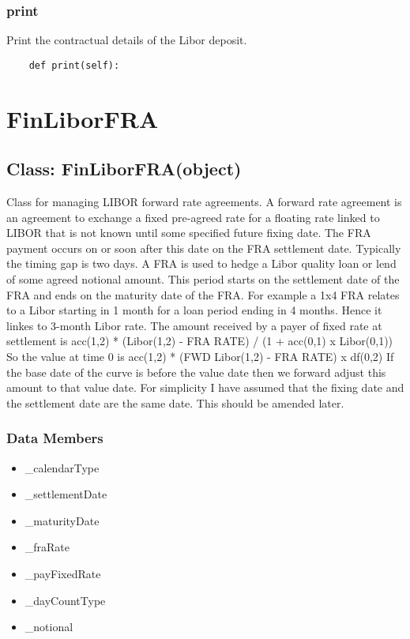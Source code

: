 \documentclass[twoside,11pt]{book}
\begin{document}
\subsubsection*{{\bf print}}
Print the contractual details of the Libor deposit.  

\begin{lstlisting}
    def print(self):
\end{lstlisting}

\newpage
\section{FinLiborFRA}

\subsection*{Class: FinLiborFRA(object)}
Class for managing LIBOR forward rate agreements. A forward rate agreement is an agreement to exchange a fixed pre-agreed rate for a floating rate linked to LIBOR that is not known until some specified future fixing date. The FRA payment occurs on or soon after this date on the FRA settlement date. Typically the timing gap is two days.  A FRA is used to hedge a Libor quality loan or lend of some agreed notional amount. This period starts on the settlement date of the FRA and ends on the maturity date of the FRA. For example a 1x4 FRA relates to a Libor starting in 1 month for a loan period ending in 4 months. Hence it linkes to 3-month Libor rate.  The amount received by a payer of fixed rate at settlement is  acc(1,2) * (Libor(1,2) - FRA RATE) / (1 + acc(0,1) x Libor(0,1))  So the value at time 0 is  acc(1,2) * (FWD Libor(1,2) - FRA RATE) x df(0,2)  If the base date of the curve is before the value date then we forward adjust this amount to that value date.  For simplicity I have assumed that the fixing date and the settlement date are the same date. This should be amended later.  

\subsubsection*{Data Members}
\begin{itemize}
\item{\_calendarType}
\item{\_settlementDate}
\item{\_maturityDate}
\item{\_fraRate}
\item{\_payFixedRate}
\item{\_dayCountType}
\item{\_notional}
\end{itemize}
\end{document}
